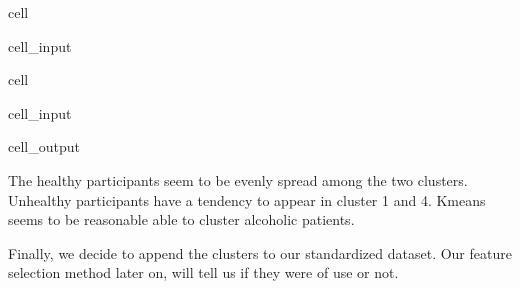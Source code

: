\documentclass[letterpaper,10pt,english]{jupyterBook}
\begin{document}
\begin{sphinxuseclass}{cell}
\begin{sphinxVerbatimInput}
\begin{sphinxuseclass}{cell_input}
\begin{sphinxVerbatim}[commandchars=\\\{\}]
\end{sphinxVerbatim}

\end{sphinxuseclass}\end{sphinxVerbatimInput}

\end{sphinxuseclass}
\begin{sphinxuseclass}{cell}\begin{sphinxVerbatimInput}

\begin{sphinxuseclass}{cell_input}
\begin{sphinxVerbatim}[commandchars=\\\{\}]
   
\end{sphinxVerbatim}

\end{sphinxuseclass}\end{sphinxVerbatimInput}
\begin{sphinxVerbatimOutput}

\begin{sphinxuseclass}{cell_output}
\noindent{}

\end{sphinxuseclass}\end{sphinxVerbatimOutput}

\end{sphinxuseclass}
\sphinxAtStartPar
The healthy participants seem to be evenly spread among the two clusters. Unhealthy participants have a tendency to appear in cluster 1 and 4. K\sphinxhyphen{}means seems to be reasonable able to cluster alcoholic  patients.

\sphinxAtStartPar
Finally, we decide to append the clusters to our standardized dataset. Our feature selection method later on, will tell us if they were of use or not.
\end{document}

